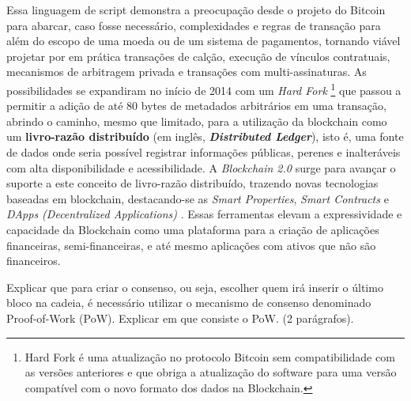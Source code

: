 \documentclass[a4paper,11pt]{article}
\begin{document}
Essa linguagem de script demonstra a preocupação desde o projeto do Bitcoin para abarcar, caso fosse necessário, complexidades e regras de transação para além do escopo de uma moeda ou de um sistema de pagamentos, tornando viável projetar por em prática transações de calção, execução de vínculos contratuais, mecanismos de arbitragem privada e transações com multi-assinaturas.
As possibilidades se expandiram no início de 2014 \cite{Greenspan2015} com um \emph{Hard Fork}
\footnote{Hard Fork é uma atualização no protocolo Bitcoin sem compatibilidade com as versões anteriores e que obriga a atualização do software para uma versão compatível com o novo formato dos dados na Blockchain.}
que passou a permitir a adição de até 80 bytes de metadados arbitrários em uma transação, abrindo o caminho, mesmo que limitado, para a utilização da blockchain como um \textbf{livro-razão distribuído} (em inglês, \textbf{\textit{Distributed Ledger}}), isto é, uma fonte de dados onde seria possível registrar informações públicas, perenes e inalteráveis com alta disponibilidade e acessibilidade.
A \emph{Blockchain 2.0} surge para avançar o suporte a este conceito de livro-razão distribuído, trazendo novas tecnologias baseadas em blockchain, destacando-se as \emph{Smart Properties}, \emph{Smart Contracts} e \emph{DApps (Decentralized Applications)} \cite{Swan2015}.
Essas ferramentas elevam a expressividade e capacidade da Blockchain como uma plataforma para a criação de aplicações financeiras, semi-financeiras, e até mesmo aplicações com ativos que não são financeiros.


{\color{ForestGreen}Explicar que para criar o consenso, ou seja, escolher quem irá inserir o último bloco na cadeia, é necessário utilizar o mecanismo de consenso denominado Proof-of-Work (PoW). Explicar em que consiste o PoW. (2 parágrafos).}

%  
\end{document}
